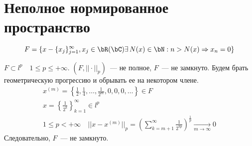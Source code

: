 \documentclass[document]{subfiles}
\begin{document}
    \section{Неполное нормированное пространство}
    \begin{definition}
        \[F = \{ x - \{x_j\}_{j=1}^\infty, x_j \in \bR (\bC) \exists \, N(x) \in \bN : n > N(x) \Rightarrow x_n = 0 \} \]
    \end{definition}
$F \subset l^p \quad 1 \leq p \leq + \infty$.
$(F, || \cdot ||_p) $~--- не полное, $F$~--- не замкнуто.
Будем брать геометрическую прогрессию и обрывать ее на некотором члене.
\begin{gather*}
    x^{(m)} = \left\{ \frac{1}{2}, \frac{1}{4}, \ldots, \frac{1}{2^m}, 0, 0, 0, \ldots \right\} \in F \\
    x = \left\{ \frac{1}{2^k}\right\}^\infty_{k=1} \in l^p \\
    1 \leq p < + \infty \quad ||x - x^{(m)}||_p = \left( \sum^\infty_{k=m+1} \frac{1}{2^{kp}} \right)^{\frac{1}{p}} \underset{m \to \infty}{\longrightarrow} 0
\end{gather*}
Следовательно, $F$~--- не замкнуто.
\end{document}
